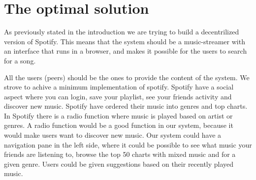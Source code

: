 \section{The optimal solution}
As previously stated in the introduction we are trying to build a decentrilized version of Spotify.
This means that the system should be a music-streamer with an interface that runs in a browser,
and makes it possible for the users to search for a song.

All the users (peers) should be the ones to provide the content of the system.
We strove to achive a minimum implementation of spotify.
Spotify have a social aspect where you can login, save your playlist, see your friends activity and discover new music.
Spotify have ordered their music into genres and top charts.
In Spotify there is a radio function where music is played based on artist or genres.
A radio function would be a good function in our system, because it would make users want to discover new music.
Our system could have a navigation pane in the left side, where it could be possible to see what music your friends are listening to, browse the top 50 charts with mixed music and for a given genre.
Users could be given suggestions based on their recently played music.
